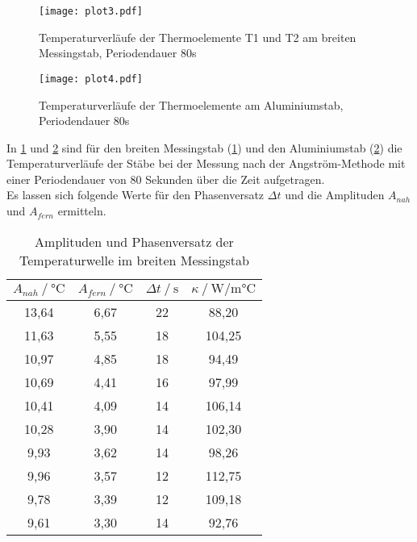 \begin{figure}
  \centering
  \texttt{[image: plot3.pdf]}
  \caption{Temperaturverläufe der Thermoelemente T1 und T2 am breiten Messingstab, Periodendauer 80s}
  \label{fig:plot3}
\end{figure}

\begin{figure}
  \centering
  \texttt{[image: plot4.pdf]}
  \caption{Temperaturverläufe der Thermoelemente am Aluminiumstab, Periodendauer 80s}
  \label{fig:plot4}
\end{figure}

In \ref{fig:plot3} und \ref{fig:plot4} sind für den breiten
Messingstab (\ref{fig:plot3}) und den Aluminiumstab (\ref{fig:plot4}) die 
Temperaturverläufe der Stäbe bei der Messung nach der Angström-Methode mit einer Periodendauer von 80 Sekunden
über die Zeit aufgetragen.\\



Es lassen sich folgende Werte für den Phasenversatz $\Delta t$ und die Amplituden $A_{nah}$ und $A_{fern}$ ermitteln.

\begin{table}[H]   
  \centering
  \caption{Amplituden und Phasenversatz der Temperaturwelle im breiten Messingstab}
  \begin{tabular}{cccc}
    \toprule
    {$A_{nah} \mathbin{/} \unit{\degreeCelsius}$} &
    {$A_{fern} \mathbin{/} \unit{\degreeCelsius}$} &    %
    {$\Delta t \mathbin{/} \unit{\second}$} &
    {$\kappa \mathbin{/} \unit{\watt / \milli\degreeCelsius}$} \\
    \midrule
    13,64 & 6,67 & 22 & 88,20 \\   
    11,63 & 5,55 & 18 & 104,25 \\
    10,97 & 4,85 & 18 & 94,49 \\   
    10,69 & 4,41 & 16 & 97,99 \\
    10,41 & 4,09 & 14 & 106,14 \\
    10,28 & 3,90 & 14 & 102,30 \\
     9,93 & 3,62 & 14 & 98,26 \\
     9,96 & 3,57 & 12 & 112,75 \\
     9,78 & 3,39 & 12 & 109,18 \\
     9,61 & 3,30 & 14 & 92,76 \\
    
    \bottomrule
  \end{tabular}
  \label{tab:TabelleA3}
\end{table}





